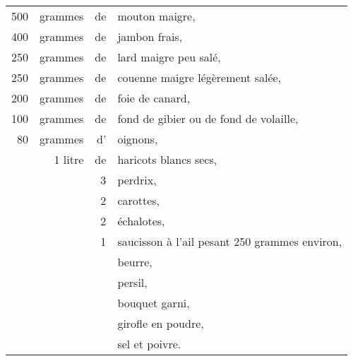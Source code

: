 \footnotesize
\begin{longtable}{rrrp{18em}}
    500 & grammes & de & mouton maigre,                                                                   \\
    400 & grammes & de & jambon frais,                                                                    \\
    250 & grammes & de & lard maigre peu salé,                                                            \\
    250 & grammes & de & couenne maigre légèrement salée,                                                 \\
    200 & grammes & de & foie de canard,                                                                  \\
    100 & grammes & de & fond de gibier ou de fond de volaille,                                           \\
     80 & grammes & d' & oignons,                                                                         \\
        & 1 litre & de & haricots blancs secs,                                                            \\
        &         &  3 & perdrix,                                                                         \\
        &         &  2 & carottes,                                                                        \\
        &         &  2 & échalotes,                                                                       \\
        &         &  1 & saucisson à l'ail pesant 250 grammes environ,                                    \\
        &         &    & beurre,                                                                          \\
        &         &    & persil,                                                                          \\
        &         &    & bouquet garni,                                                                   \\
        &         &    & girofle en poudre,                                                               \\
        &         &    & sel et poivre.                                                                   \\
\end{longtable}
\normalsize

